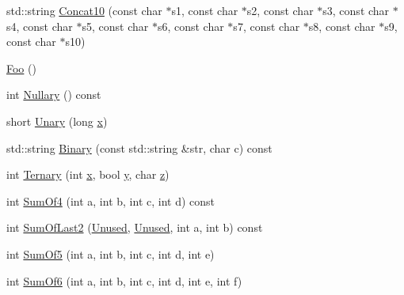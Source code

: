 \begin{DoxyCompactItemize}
std\+::string \mbox{\hyperlink{classtesting_1_1gmock__more__actions__test_1_1_foo_ad5b1d2dd1bcec98fdc90a05487ec3b14}{Concat10}} (const char $\ast$s1, const char $\ast$s2, const char $\ast$s3, const char $\ast$s4, const char $\ast$s5, const char $\ast$s6, const char $\ast$s7, const char $\ast$s8, const char $\ast$s9, const char $\ast$s10)
\item 
\mbox{\hyperlink{classtesting_1_1gmock__more__actions__test_1_1_foo_ad2603a65b94e019c75f4227787b9177e}{Foo}} ()
\item 
int \mbox{\hyperlink{classtesting_1_1gmock__more__actions__test_1_1_foo_ad6ba38dbb9b1594ac178630f07c4baa5}{Nullary}} () const
\item 
short \mbox{\hyperlink{classtesting_1_1gmock__more__actions__test_1_1_foo_a68d2b46d6cc7d51979b0254940af6090}{Unary}} (long \mbox{\hyperlink{_obj__test_2lib_2googletest-master_2googlemock_2test_2gmock-matchers__test_8cc_a6150e0515f7202e2fb518f7206ed97dc}{x}})
\item 
std\+::string \mbox{\hyperlink{classtesting_1_1gmock__more__actions__test_1_1_foo_a8ee56742c6c025af680617464c71ecef}{Binary}} (const std\+::string \&str, char c) const
\item 
int \mbox{\hyperlink{classtesting_1_1gmock__more__actions__test_1_1_foo_afc5b86988210ad598fa3a2a9822297e4}{Ternary}} (int \mbox{\hyperlink{_obj__test_2lib_2googletest-master_2googlemock_2test_2gmock-matchers__test_8cc_a6150e0515f7202e2fb518f7206ed97dc}{x}}, bool \mbox{\hyperlink{_obj__test_2lib_2googletest-master_2googlemock_2test_2gmock-matchers__test_8cc_a39cb44155237f0205e0feb931d5acbed}{y}}, char \mbox{\hyperlink{_obj__test_2lib_2googletest-master_2googlemock_2test_2gmock-matchers__test_8cc_a196ff6a287f53f758b1506f21269fc77}{z}})
\item 
int \mbox{\hyperlink{classtesting_1_1gmock__more__actions__test_1_1_foo_a69ca68e84528904032bad9533a23fb0a}{Sum\+Of4}} (int a, int b, int c, int d) const
\item 
int \mbox{\hyperlink{classtesting_1_1gmock__more__actions__test_1_1_foo_abc041eb7a8e8211656495f2540f315ec}{Sum\+Of\+Last2}} (\mbox{\hyperlink{namespacetesting_a603e329ec0263ebfcf16f712810bd511}{Unused}}, \mbox{\hyperlink{namespacetesting_a603e329ec0263ebfcf16f712810bd511}{Unused}}, int a, int b) const
\item 
int \mbox{\hyperlink{classtesting_1_1gmock__more__actions__test_1_1_foo_a55fb0cdc224c450f401e0fea4f979512}{Sum\+Of5}} (int a, int b, int c, int d, int e)
\item 
int \mbox{\hyperlink{classtesting_1_1gmock__more__actions__test_1_1_foo_a34b5ae7cd4620331af92c637e3534bc4}{Sum\+Of6}} (int a, int b, int c, int d, int e, int f)

\end{DoxyCompactItemize}
